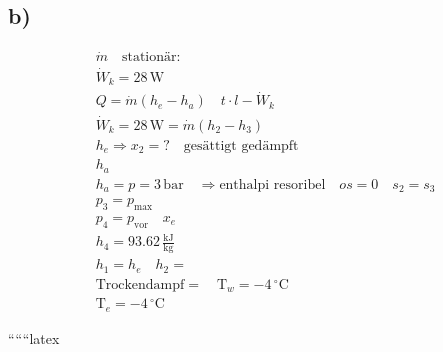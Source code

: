 

\subsection*{b)}

\begin{align*}
&\dot{m} \quad \text{stationär:} \\
&\dot{W}_k = 28 \, \text{W} \\
&Q = \dot{m} (h_e - h_a) \quad t \cdot l - \dot{W}_k \\
&\dot{W}_k = 28 \, \text{W} = \dot{m} (h_2 - h_3) \\
&h_e \Rightarrow x_2 = ? \quad \text{gesättigt gedämpft} \\
&h_a \\
&h_a = p = 3 \, \text{bar} \quad \Rightarrow \text{enthalpi resoribel} \quad os = 0 \quad s_2 = s_3 \\
&p_3 = p_{\text{max}} \\
&p_4 = p_{\text{vor}} \quad x_e \\
&h_4 = 93.62 \, \frac{\text{kJ}}{\text{kg}} \\
&h_1 = h_e \quad h_2 = \\
&\text{Trockendampf} = \quad \text{T}_w = -4 \, ^\circ \text{C} \\
&\text{T}_e = -4 \, ^\circ \text{C}
\end{align*}

``````latex